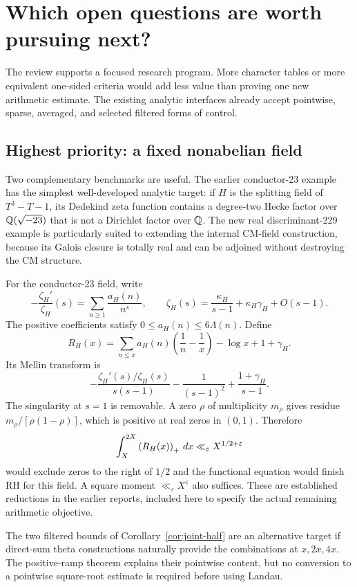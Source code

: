 \section{Which open questions are worth pursuing next?}

The review supports a focused research program. More character tables or more equivalent one-sided criteria would add less value than proving one new arithmetic estimate. The existing analytic interfaces already accept pointwise, sparse, averaged, and selected filtered forms of control.

\subsection{Highest priority: a fixed nonabelian field}

Two complementary benchmarks are useful. The earlier conductor-23 example has the simplest well-developed analytic target: if $H$ is the splitting field of $T^3-T-1$, its Dedekind zeta function contains a degree-two Hecke factor over $\mathbb Q(\sqrt{-23})$ that is not a Dirichlet factor over $\mathbb Q$. The new real discriminant-229 example is particularly suited to extending the internal CM-field construction, because its Galois closure is totally real and can be adjoined without destroying the CM structure.\cite{priorMean,Cogdell}

For the conductor-23 field, write
\[
 -\frac{\zeta_H'}{\zeta_H}(s)=\sum_{n\ge1}\frac{a_H(n)}{n^s},
 \qquad
 \zeta_H(s)=\frac{\kappa_H}{s-1}+\kappa_H\gamma_H+O(s-1).
\]
The positive coefficients satisfy $0\le a_H(n)\le6\Lambda(n)$. Define
\[
 R_H(x)=\sum_{n\le x}a_H(n)\left(\frac1n-\frac1x\right)
         -\log x+1+\gamma_H.
\]
Its Mellin transform is
\[
 -\frac{\zeta_H'(s)/\zeta_H(s)}{s(s-1)}
 -\frac1{(s-1)^2}+\frac{1+\gamma_H}{s-1}.
\]
The singularity at $s=1$ is removable. A zero $\rho$ of multiplicity $m_\rho$ gives residue $m_\rho/[\rho(1-\rho)]$, which is positive at real zeros in $(0,1)$. Therefore
\begin{equation}\label{eq:target-mean}
 \int_X^{2X}\left(R_H(x)\right)_{+}\,dx\ll_\varepsilon X^{1/2+\varepsilon}
\end{equation}
would exclude zeros to the right of $1/2$ and the functional equation would finish RH for this field. A square moment $\ll_\varepsilon X^\varepsilon$ also suffices. These are established reductions in the earlier reports, included here to specify the actual remaining arithmetic objective.\cite{priorMean}

The two filtered bounds of Corollary~\ref{cor:joint-half} are an alternative target if direct-sum theta constructions naturally provide the combinations at $x,2x,4x$. The positive-ramp theorem explains their pointwise content, but no conversion to a pointwise square-root estimate is required before using Landau.


